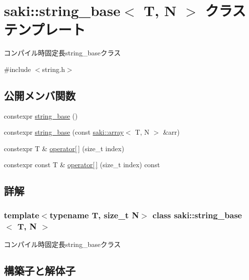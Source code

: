 \hypertarget{classsaki_1_1string__base}{}\section{saki\+:\+:string\+\_\+base$<$ T, N $>$ クラステンプレート}
\label{classsaki_1_1string__base}


コンパイル時固定長string\+\_\+baseクラス  




{\ttfamily \#include $<$string.\+h$>$}

\subsection*{公開メンバ関数}
\begin{DoxyCompactItemize}
\item 
constexpr \mbox{\hyperlink{classsaki_1_1string__base_a5301a26e787034be1365a23964a267fd}{string\+\_\+base}} ()
\item 
constexpr \mbox{\hyperlink{classsaki_1_1string__base_a72a95e9a65c0e1e4bcbd47fca9c78281}{string\+\_\+base}} (const \mbox{\hyperlink{classsaki_1_1array}{saki\+::array}}$<$ T, N $>$ \&arr)
\item 
constexpr T \& \mbox{\hyperlink{classsaki_1_1string__base_aca7367871a2c8e1722032240f4fa42fa}{operator\mbox{[}$\,$\mbox{]}}} (size\+\_\+t index)
\item 
constexpr const T \& \mbox{\hyperlink{classsaki_1_1string__base_abfd90384f8529e8ac5cecb910000ac3b}{operator\mbox{[}$\,$\mbox{]}}} (size\+\_\+t index) const
\end{DoxyCompactItemize}


\subsection{詳解}
\subsubsection*{template$<$typename T, size\+\_\+t N$>$\newline
class saki\+::string\+\_\+base$<$ T, N $>$}

コンパイル時固定長string\+\_\+baseクラス 

\subsection{構築子と解体子}
\mbox{\label{classsaki_1_1string__base_a5301a26e787034be1365a23964a267fd}} 
